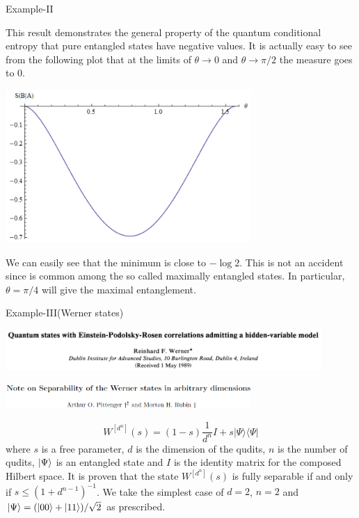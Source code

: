 \documentclass{beamer}
\begin{document}
\begin{frame}{Example-II}
\begin{scriptsize}
This result demonstrates the general property of the quantum conditional entropy that pure entangled states have negative values. It is actually easy to see from the following plot that at the limits of $\theta \rightarrow 0$ and $
\theta \rightarrow \pi /2$ the measure goes to 0.
\begin{center}
\includegraphics[width=0.7\textwidth]{figures/cond_ent_plot.png}\label{fig1}
\end{center}
We can easily see that the minimum is close to $-\log2$. This is not an accident since is common among the so called maximally entangled states. In particular, $\theta= \pi /4$ will give the maximal entanglement.
\end{scriptsize}
\end{frame}

\begin{frame}{Example-III(Werner states)}
\begin{scriptsize}
\begin{center}
\includegraphics[width=0.9\textwidth]{figures/paperfig10.png}
\end{center}
\begin{center}
\includegraphics[width=0.7\textwidth]{figures/paperfig11.png}
\end{center}
\begin{equation*}
W^{\left[d^{n}\right]}(s)=(1-s) \frac{1}{d^{n}} I+s|\Psi\rangle\langle\Psi|
\label{wernerstate}
\end{equation*}
where $s$ is a free parameter, $d$ is the dimension of the qudits, $n$ is the number of qudits, $\ket{\Psi}$ is an  entangled state and $I$ is the identity matrix for the composed Hilbert space. It is proven that the state   $W^{\left[d^{n}\right]}(s)$ is fully separable if and only if $s \leq\left(1+d^{n-1}\right)^{-1}$.
We take the simplest case of $d=2$, $n=2$ and $\ket{\Psi}=(\ket{00}+\ket{11})/\sqrt{2}$ as prescribed.
\end{scriptsize} 
\end{frame}
\end{document}

